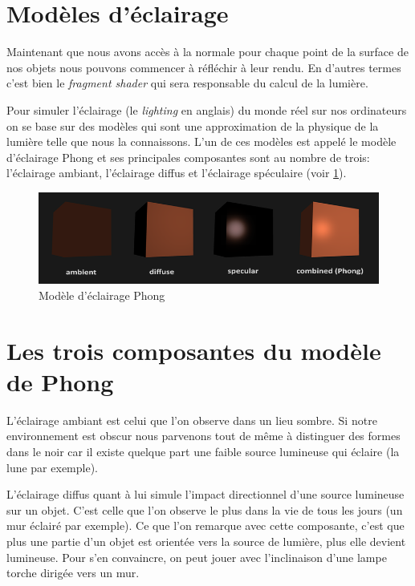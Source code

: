 \newpage
\section{Modèles d'éclairage}

Maintenant que nous avons accès à la normale pour chaque point de la surface de nos objets nous pouvons commencer à réfléchir à leur rendu. En d'autres termes c'est bien le \textit{fragment shader} qui sera responsable du calcul de la lumière.

Pour simuler l'éclairage (le \textit{lighting} en anglais) du monde réel sur nos ordinateurs on se base sur des modèles qui sont une approximation de la physique de la lumière telle que nous la connaissons. L'un de ces modèles est appelé le modèle d'éclairage Phong et ses principales composantes sont au nombre de trois: l'éclairage ambiant, l'éclairage diffus et l'éclairage spéculaire (voir \ref{phong00}).

\begin{figure}[h]
    \centering
    \includegraphics[width=0.9\linewidth]{images//shaders/phong00.png}
    \caption{Modèle d'éclairage Phong}
    \label{phong00}
\end{figure}

\section{Les trois composantes du modèle de Phong}
L'éclairage ambiant est celui que l'on observe dans un lieu sombre. Si notre environnement est obscur nous parvenons tout de même à distinguer des formes dans le noir car il existe quelque part une faible source lumineuse qui éclaire (la lune par exemple).

L'éclairage diffus quant à lui simule l'impact directionnel d'une source lumineuse sur un objet. C'est celle que l'on observe le plus dans la vie de tous les jours (un mur éclairé par exemple). Ce que l'on remarque avec cette composante, c'est que plus une partie d'un objet est orientée vers la source de lumière, plus elle devient lumineuse. Pour s'en convaincre, on peut jouer avec l'inclinaison d'une lampe torche dirigée vers un mur.

